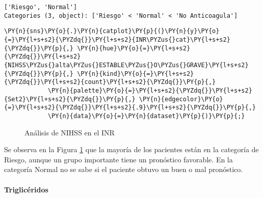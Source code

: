             \begin{tcolorbox}[breakable, size=fbox, boxrule=.5pt, pad at break*=1mm, opacityfill=0]
\begin{Verbatim}[commandchars=\\\{\}]
['Riesgo', 'Normal']
Categories (3, object): ['Riesgo' < 'Normal' < 'No Anticoagula']
\end{Verbatim}
\end{tcolorbox}
        
    \begin{tcolorbox}[breakable, size=fbox, boxrule=1pt, pad at break*=1mm,colback=cellbackground, colframe=cellborder]
\begin{Verbatim}[commandchars=\\\{\}]
\PY{n}{sns}\PY{o}{.}\PY{n}{catplot}\PY{p}{(}\PY{n}{y}\PY{o}{=}\PY{l+s+s2}{\PYZdq{}}\PY{l+s+s2}{INR\PYZus{}cat}\PY{l+s+s2}{\PYZdq{}}\PY{p}{,} \PY{n}{hue}\PY{o}{=}\PY{l+s+s2}{\PYZdq{}}\PY{l+s+s2}{NIHSS\PYZus{}alta\PYZus{}ESTABLE\PYZus{}O\PYZus{}GRAVE}\PY{l+s+s2}{\PYZdq{}}\PY{p}{,} \PY{n}{kind}\PY{o}{=}\PY{l+s+s2}{\PYZdq{}}\PY{l+s+s2}{count}\PY{l+s+s2}{\PYZdq{}}\PY{p}{,}
            \PY{n}{palette}\PY{o}{=}\PY{l+s+s2}{\PYZdq{}}\PY{l+s+s2}{Set2}\PY{l+s+s2}{\PYZdq{}}\PY{p}{,} \PY{n}{edgecolor}\PY{o}{=}\PY{l+s+s2}{\PYZdq{}}\PY{l+s+s2}{.9}\PY{l+s+s2}{\PYZdq{}}\PY{p}{,}
            \PY{n}{data}\PY{o}{=}\PY{n}{dataset}\PY{p}{)}\PY{p}{;}
\end{Verbatim}
\end{tcolorbox}

\begin{center}
    	\begin{figure}[H]
	\centering
	\caption{Análisis de NIHSS en el INR}
	\label{fig:aNISSi}
	\end{figure}
\end{center}
    
    Se observa en la Figura \ref{fig:aNISSi} que la mayoría de los pacientes están en la categoría de Riesgo, aunque un grupo importante tiene un pronóstico favorable. En la categoría Normal no se sabe si el paciente obtuvo un buen o mal pronóstico.

    \hypertarget{triglicuxe9ridos}{%
\paragraph{Triglicéridos}\label{triglicuxe9ridos}}

